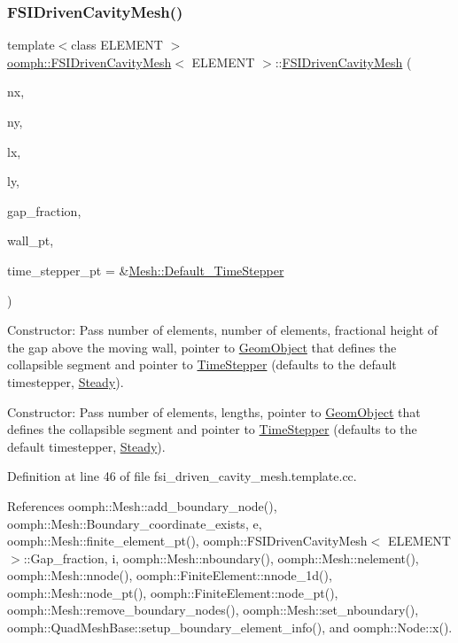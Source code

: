 \subsubsection{\texorpdfstring{F\+S\+I\+Driven\+Cavity\+Mesh()}{FSIDrivenCavityMesh()}}
{\footnotesize\ttfamily template$<$class E\+L\+E\+M\+E\+NT $>$ \\
\hyperlink{classoomph_1_1FSIDrivenCavityMesh}{oomph\+::\+F\+S\+I\+Driven\+Cavity\+Mesh}$<$ E\+L\+E\+M\+E\+NT $>$\+::\hyperlink{classoomph_1_1FSIDrivenCavityMesh}{F\+S\+I\+Driven\+Cavity\+Mesh} (\begin{DoxyParamCaption}\item[{const unsigned \&}]{nx,  }\item[{const unsigned \&}]{ny,  }\item[{const double \&}]{lx,  }\item[{const double \&}]{ly,  }\item[{const double \&}]{gap\+\_\+fraction,  }\item[{\hyperlink{classoomph_1_1GeomObject}{Geom\+Object} $\ast$}]{wall\+\_\+pt,  }\item[{\hyperlink{classoomph_1_1TimeStepper}{Time\+Stepper} $\ast$}]{time\+\_\+stepper\+\_\+pt = {\ttfamily \&\hyperlink{classoomph_1_1Mesh_a12243d0fee2b1fcee729ee5a4777ea10}{Mesh\+::\+Default\+\_\+\+Time\+Stepper}} }\end{DoxyParamCaption})}



Constructor\+: Pass number of elements, number of elements, fractional height of the gap above the moving wall, pointer to \hyperlink{classoomph_1_1GeomObject}{Geom\+Object} that defines the collapsible segment and pointer to \hyperlink{classoomph_1_1TimeStepper}{Time\+Stepper} (defaults to the default timestepper, \hyperlink{classoomph_1_1Steady}{Steady}). 

Constructor\+: Pass number of elements, lengths, pointer to \hyperlink{classoomph_1_1GeomObject}{Geom\+Object} that defines the collapsible segment and pointer to \hyperlink{classoomph_1_1TimeStepper}{Time\+Stepper} (defaults to the default timestepper, \hyperlink{classoomph_1_1Steady}{Steady}). 

Definition at line 46 of file fsi\+\_\+driven\+\_\+cavity\+\_\+mesh.\+template.\+cc.



References oomph\+::\+Mesh\+::add\+\_\+boundary\+\_\+node(), oomph\+::\+Mesh\+::\+Boundary\+\_\+coordinate\+\_\+exists, e, oomph\+::\+Mesh\+::finite\+\_\+element\+\_\+pt(), oomph\+::\+F\+S\+I\+Driven\+Cavity\+Mesh$<$ E\+L\+E\+M\+E\+N\+T $>$\+::\+Gap\+\_\+fraction, i, oomph\+::\+Mesh\+::nboundary(), oomph\+::\+Mesh\+::nelement(), oomph\+::\+Mesh\+::nnode(), oomph\+::\+Finite\+Element\+::nnode\+\_\+1d(), oomph\+::\+Mesh\+::node\+\_\+pt(), oomph\+::\+Finite\+Element\+::node\+\_\+pt(), oomph\+::\+Mesh\+::remove\+\_\+boundary\+\_\+nodes(), oomph\+::\+Mesh\+::set\+\_\+nboundary(), oomph\+::\+Quad\+Mesh\+Base\+::setup\+\_\+boundary\+\_\+element\+\_\+info(), and oomph\+::\+Node\+::x().



